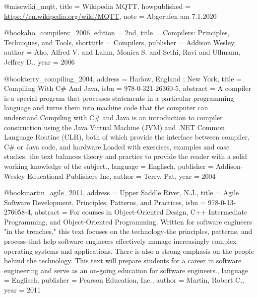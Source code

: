 @misc{wiki_mqtt, 
		title  = {{Wikipedia MQTT}},
		howpublished = {\newline  \url{https://en.wikipedia.org/wiki/MQTT}},
		note  =  {\newline Abgerufen am 7.1.2020}
}










@book{aho_compilers:_2006,
	edition = {2nd},
	title = {Compilers: {Principles}, {Techniques}, and {Tools}},
	shorttitle = {Compilers},
	publisher = {Addison Wesley},
	author = {Aho, Alfred V. and Lahm, Monica S. and Sethi, Ravi and Ullmann, Jeffrey D.},
	year = {2006}
}

@book{terry_compiling_2004,
	address = {Harlow, England ; New York},
	title = {Compiling {With} {C}\# {And} {Java}},
	isbn = {978-0-321-26360-5},
	abstract = {A compiler is a special program that processes statements in a particular programming language and turns them into machine code that the computer can understand.Compiling with C\# and Java is an introduction to compiler construction using the Java Virtual Machine (JVM) and .NET Common Language Routine (CLR), both of which provide the interface between compiler, C\# or Java code, and hardware.Loaded with exercises, examples and case studies, the text balances theory and practice to provide the reader with a solid working knowledge of the subject.},
	language = {Englisch},
	publisher = {Addison-Wesley Educational Publishers Inc},
	author = {Terry, Pat},
	year = {2004}
}

@book{martin_agile_2011,
	address = {Upper Saddle River, N.J.},
	title = {Agile {Software} {Development}, {Principles}, {Patterns}, and {Practices}},
	isbn = {978-0-13-276058-4},
	abstract = {For courses in Object-Oriented Design, C++ Intermediate Programming, and Object-Oriented Programming.  Written for software engineers "in the trenches," this text focuses on the technology-the principles, patterns, and process-that help software engineers effectively manage increasingly complex operating systems and applications. There is also a strong emphasis on the people behind the technology. This text will prepare students for a career in software engineering and serve as an on-going education for software engineers.},
	language = {Englisch},
	publisher = {Pearson Education, Inc.},
	author = {Martin, Robert C.},
	year = {2011}
}

